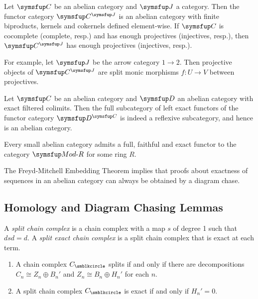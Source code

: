 \begin{example}
  Let $\CAT{C}$ be an abelian category and $\CAT{J}$ a category. Then the functor category $\CAT{C}^{\CAT{J}}$ is an abelian category with finite biproducts, kernels and cokernels defined element-wise. If $\CAT{C}$ is cocomplete (complete, resp.) and has enough projectives (injectives, resp.), then $\CAT{C}^{\CAT{J}}$ has enough projectives (injectives, resp.).

  For example, let $\CAT{J}$ be the arrow category $1\to 2$. Then projective objects of $\CAT{C}^{\CAT{J}}$ are split monic morphisms $f\colon U\to V$ between projectives.
\end{example}

\begin{proposition}[Gabriel]
  Let $\CAT{C}$ be an abelian category and $\CAT{D}$ an abelian category with exact filtered colimits. Then the full subcategory of left exact functors of the functor category $\CAT{D}^{\CAT{C}}$ is indeed a reflexive subcategory, and hence is an abelian category.
\end{proposition}

\begin{theorem}
  Every small abelian category admits a full, faithful and exact functor to the category $\MODR$ for some ring $R$.
\end{theorem}

The Freyd-Mitchell Embedding Theorem implies that proofs about exactness of sequences in an abelian category can always be obtained by a diagram chase.

\subsection{Homology and Diagram Chasing Lemmas}

A \emph{split chain complex} is a chain complex with a map $s$ of degree 1 such that $dsd=d$. A \emph{split exact chain complex} is a split chain complex that is exact at each term.

\begin{proposition}\hspace*{\fill}
  \begin{enumerate}
    \item A chain complex $C_{\CCCIR}$ splits if and only if there are decompositions $C_n\cong Z_n\oplus B_n'$ and $Z_n\cong B_n\oplus H_n'$ for each $n$.
    \item A split chain complex $C_{\CCCIR}$ is exact if and only if $H_n'=0$.
  \end{enumerate}
\end{proposition}

